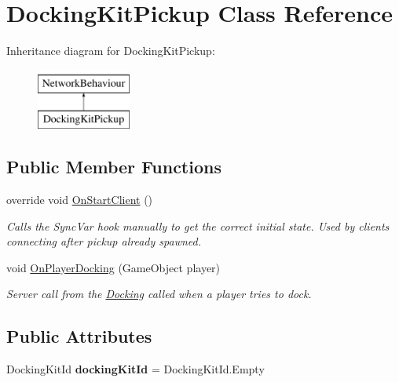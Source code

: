 \hypertarget{class_docking_kit_pickup}{}\section{Docking\+Kit\+Pickup Class Reference}
\label{class_docking_kit_pickup}
Inheritance diagram for Docking\+Kit\+Pickup\+:\begin{figure}[H]
\begin{center}
\leavevmode
\includegraphics[height=2.000000cm]{class_docking_kit_pickup}
\end{center}
\end{figure}
\subsection*{Public Member Functions}
\begin{DoxyCompactItemize}
\item 
override void \hyperlink{class_docking_kit_pickup_a69844bc6d4f3f82e8b9143b6865122c2}{On\+Start\+Client} ()
\begin{DoxyCompactList}\small\item\em Calls the Sync\+Var hook manually to get the correct initial state. Used by clients connecting after pickup already spawned. \end{DoxyCompactList}\item 
void \hyperlink{class_docking_kit_pickup_a67744f685af4efb8875007dbb4451a28}{On\+Player\+Docking} (Game\+Object player)
\begin{DoxyCompactList}\small\item\em Server call from the \hyperlink{class_docking}{Docking} called when a player tries to dock. \end{DoxyCompactList}\end{DoxyCompactItemize}
\subsection*{Public Attributes}
\begin{DoxyCompactItemize}
\item 
\hypertarget{class_docking_kit_pickup_a34cca95ea2d12201322cf57f4ab066e3}{}\label{class_docking_kit_pickup_a34cca95ea2d12201322cf57f4ab066e3} 
Docking\+Kit\+Id {\bfseries docking\+Kit\+Id} = Docking\+Kit\+Id.\+Empty
\end{DoxyCompactItemize}


